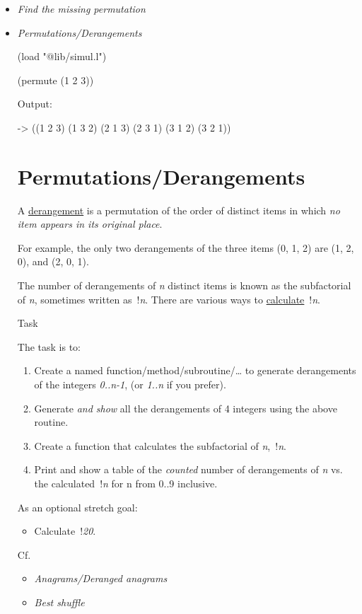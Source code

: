 \begin{itemize}
\item \emph{Find the missing permutation}
\item
  \emph{Permutations/Derangements}


\begin{wideverbatim}

(load "@lib/simul.l")

(permute (1 2 3))

Output:

-> ((1 2 3) (1 3 2) (2 1 3) (2 3 1) (3 1 2) (3 2 1))

\end{wideverbatim}

\pagebreak{}
\section*{Permutations/Derangements}

A \href{http://mathworld.wolfram.com/Derangement.html}{derangement} is a
permutation of the order of distinct items in which \emph{no item
appears in its original place}.

For example, the only two derangements of the three items (0, 1, 2) are
(1, 2, 0), and (2, 0, 1).

The number of derangements of \emph{n} distinct items is known as the
subfactorial of \emph{n}, sometimes written as~!\emph{n}. There are
various ways to
\href{http://en.wikipedia.org/wiki/Derangement\#Counting\_derangements}{calculate}~!\emph{n}.

Task

The task is to:

\begin{enumerate}
\item
  Create a named function/method/subroutine/\ldots{} to generate
  derangements of the integers \emph{0..n-1}, (or \emph{1..n} if you
  prefer).
\item
  Generate \emph{and show} all the derangements of 4 integers using the
  above routine.
\item
  Create a function that calculates the subfactorial of
  \emph{n},~!\emph{n}.
\item
  Print and show a table of the \emph{counted} number of derangements of
  \emph{n} vs. the calculated~!\emph{n} for n from 0..9 inclusive.
\end{enumerate}

As an optional stretch goal:

\begin{itemize}
\item
  Calculate~!\emph{20}.
\end{itemize}

Cf.

\begin{itemize}
\item
  \emph{Anagrams/Deranged anagrams}
\item
  \emph{Best shuffle}
\end{itemize}


\end{itemize}


